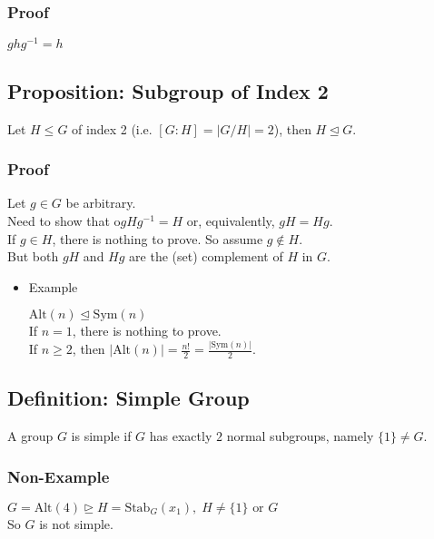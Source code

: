 \documentclass[11pt]{article}
\newcommand{\0}{\emptyset}
\begin{document}
\subsubsection*{Proof}
\label{sec:org19e05ad}
\(ghg^{-1}=h\)\\[0pt]
\subsection*{Proposition: Subgroup of Index 2}
\label{sec:org5665238}
Let \(H\leq G\) of index 2 (i.e. \([G:H]=|G/H|=2\)), then \(H\trianglelefteq G\).\\[0pt]
\subsubsection*{Proof}
\label{sec:org78ab361}
Let \(g\in G\) be arbitrary.\\[0pt]
Need to show that o\(gHg^{-1}=H\) or, equivalently, \(gH=Hg\).\\[0pt]
If \(g\in H\), there is nothing to prove. So assume \(g\not\in H\).\\[0pt]
But both \(gH\) and \(Hg\) are the (set) complement of \(H\) in \(G\).\\[0pt]

\begin{itemize}
\item Example
\label{sec:orgced12b1}

\(\text{Alt}(n)\trianglelefteq\text{Sym}(n)\)\\[0pt]
If \(n=1\), there is nothing to prove.\\[0pt]
If \(n\geq 2\), then \(|\text{Alt}(n)|=\frac{n!}{2}=\frac{|\text{Sym}(n)|}{2}\).\\[0pt]
\end{itemize}
\subsection*{Definition: Simple Group}
\label{sec:org7a9bafd}
A group \(G\) is simple if \(G\) has exactly \(2\) normal subgroups, namely \(\{1\}\neq G\).\\[0pt]
\subsubsection*{Non-Example}
\label{sec:org2003ccc}
\(G=\text{Alt}(4)\trianglerighteq H=\text{Stab}_{G}(x_{1}),\;H\neq\{1\}\text{ or }G\)\\[0pt]
So \(G\) is not simple.\\[0pt]
\end{document}
